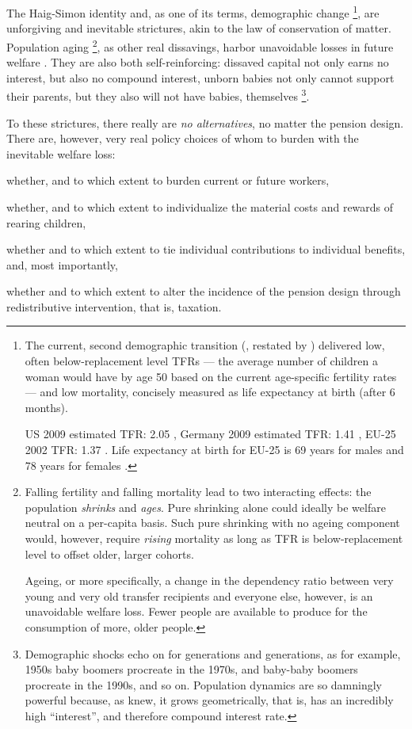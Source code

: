 \documentclass[11pt,a4paper,oneside,openright]{article}
\begin{document}
The Haig-Simon identity and, as one of its terms, demographic change
\footnote{
	The current, second demographic transition (\citealt{Davis1945}, restated by \citealt{Caldwell-1976-aa}) delivered low, often below-replacement level \glspl{TFR} --- the average number of children a woman would have by age 50 based on the current age-specific fertility rates --- and low mortality, concisely measured as life expectancy at birth (after 6 months).
	 
	US 2009 estimated TFR: 2.05 \citep{CIA2009}, Germany 2009 estimated TFR: 1.41 \citep{CIA2009}, EU-25 2002 TFR: 1.37 \citep[2]{Demeny-2003-aa}. 
	Life expectancy at birth for EU-25 is 69 years for males and 78 years for females \citep[2]{Demeny-2003-aa}.
}, 
are unforgiving and inevitable strictures, akin to the law of conservation of matter. 
Population aging
\footnote{
	Falling fertility and falling mortality lead to two interacting effects: 
	the population \emph{shrinks} and \emph{ages}. 
	Pure shrinking alone could ideally be welfare neutral on a per-capita basis. 
	Such pure shrinking with no ageing component would, however, require \emph{rising} mortality as long as TFR is below-replacement level to offset older, larger cohorts.
	
	Ageing, or more specifically, a change in the dependency ratio between very young and very old transfer recipients and everyone else, however, is an unavoidable welfare loss. 
	Fewer people are available to produce for the consumption of more, older people.
},
as other real dissavings, harbor unavoidable losses in future welfare \citep[e.g.][152]{Borsch-Supan2003}. 
They are also both self-reinforcing: 
dissaved capital not only earns no interest, but also no compound interest, unborn babies not only cannot support their parents, but they also will not have babies, themselves
\footnote{
	Demographic shocks echo on for generations and generations, as for example, 1950s baby boomers procreate in the 1970s, and baby-baby boomers procreate in the 1990s, and so on. 
	Population dynamics are so damningly powerful because, as \cite{Malthus1798} knew, it grows geometrically, that is, has an incredibly high ``interest'', and therefore compound interest rate.
}.

To these strictures, there really are \emph{no alternatives}, no matter the pension design. 
There are, however, very real policy choices of whom to burden with the inevitable welfare loss: 
\begin{inparaenum} 
	\item whether, and to which extent to burden current or future workers, 
	\item whether, and to which extent to individualize the material costs and rewards of rearing children, 
	\item whether and to which extent to tie individual contributions to individual benefits, and, most importantly, 
	\item whether and to which extent to alter the incidence of the pension design through redistributive intervention, that is, taxation. 
\end{inparaenum}
\end{document}
